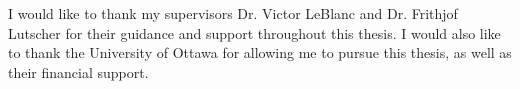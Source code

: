 \documentclass[12pt]{UOthesis}
\theoremstyle{remarkstyle}
\begin{document}

I would like to thank my supervisors Dr. Victor LeBlanc and Dr. Frithjof Lutscher for their guidance and support throughout this thesis. I would also like to thank the University of Ottawa for allowing me to pursue this thesis, as well as their financial support.

\cleardoublepage

\tableofcontents
\cleardoublepage

\ListOfFigures
\cleardoublepage

\ListOfTables
\cleardoublepage

%
%
%
\PrintNomenclature
\cleardoublepage
\end{document}
